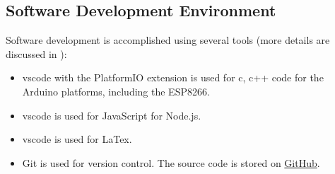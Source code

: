\subsection{Software Development Environment}
Software development is accomplished using several tools (more details are discussed in ):
\begin{itemize}
\item \gls{vscode} with the PlatformIO extension is used for c, c++ code for the Arduino platforms, including the ESP8266.
\item \gls{vscode} is used for JavaScript for Node.js.
\item \gls{vscode} is used for LaTex.
\item Git is used for version control. The source code is stored on \href{https://github.com/djbristow/RAILS}{GitHub}.
\end{itemize}
